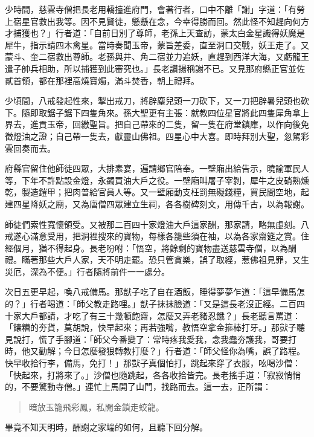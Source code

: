 少時間，慈雲寺僧把長老用轎擡進府門，會著行者，口中不離「謝」字道：「有勞上宿星官救出我等。因不見賢徒，懸懸在念，今幸得勝而回。然此怪不知趕向何方才捕獲也？」行者道：「自前日別了尊師，老孫上天查訪，蒙太白金星識得妖魔是犀牛，指示請四木禽星。當時奏聞玉帝，蒙旨差委，直至洞口交戰，妖王走了。又蒙斗、奎二宿救出尊師。老孫與井、角二宿並力追妖，直趕到西洋大海，又虧龍王遣子帥兵相助，所以捕獲到此審究也。」長老讚揚稱謝不已。又見那府縣正官並佐貳首領，都在那裡高燒寶燭，滿斗焚香，朝上禮拜。

少頃間，八戒發起性來，掣出戒刀，將辟塵兒頭一刀砍下，又一刀把辟暑兒頭也砍下。隨即取鋸子鋸下四隻角來。孫大聖更有主張：就教四位星官將此四隻犀角拿上界去，進貢玉帝，回繳聖旨。把自己帶來的二隻，留一隻在府堂鎮庫，以作向後免徵燈油之證；自己帶一隻去，獻靈山佛祖。四星心中大喜。即時拜別大聖，忽駕彩雲回奏而去。

府縣官留住他師徒四眾，大排素宴，遍請鄉官陪奉。一壁廂出給告示，曉諭軍民人等，下年不許點設金燈，永蠲買油大戶之役。一壁廂叫屠子宰剝，犀牛之皮硝熟燻乾，製造鎧甲；把肉普給官員人等。又一壁廂動支枉罰無礙錢糧，買民間空地，起建四星降妖之廟，又為唐僧四眾建立生祠，各各樹碑刻文，用傳千古，以為報謝。

師徒們索性寬懷領受。又被那二百四十家燈油大戶這家酬，那家請，略無虛刻。八戒遂心滿意受用，把洞裡搜來的寶物，每樣各籠些須在袖，以為各家齋筵之賞。住經個月，猶不得起身。長老吩咐：「悟空，將餘剩的寶物盡送慈雲寺僧，以為酬禮。瞞著那些大戶人家，天不明走罷。恐只管貪樂，誤了取經，惹佛祖見罪，又生災厄，深為不便。」行者隨將前件一一處分。

次日五更早起，喚八戒備馬。那獃子吃了自在酒飯，睡得夢夢乍道：「這早備馬怎的？」行者喝道：「師父教走路哩。」獃子抹抹臉道：「又是這長老沒正經。二百四十家大戶都請，才吃了有三十幾頓飽齋，怎麼又弄老豬忍餓？」長老聽言罵道：「饢糟的夯貨，莫胡說，快早起來；再若強嘴，教悟空拿金箍棒打牙。」那獃子聽見說打，慌了手腳道：「師父今番變了：常時疼我愛我，念我蠢夯護我，哥要打時，他又勸解；今日怎麼發狠轉教打麼？」行者道：「師父怪你為嘴，誤了路程。快早收拾行李，備馬，免打！」那獃子真個怕打，跳起來穿了衣服，吆喝沙僧：「快起來，打將來了。」沙僧也隨跳起，各各收拾皆完。長老搖手道：「寂寂悄悄的，不要驚動寺僧。」連忙上馬開了山門，找路而去。這一去，正所謂：
\begin{quote}
暗放玉籠飛彩鳳，私開金鎖走蛟龍。
\end{quote}

畢竟不知天明時，酬謝之家端的如何，且聽下回分解。
